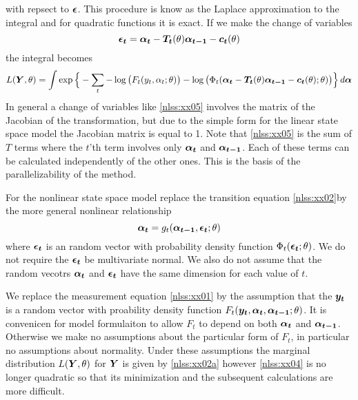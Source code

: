 with repsect to $\boldsymbol{\epsilon}$.
This procedure is know as the Laplace approximation to the integral
and for quadratic functions it is exact.
If we make the change of variables
\begin{equation}
 \boldsymbol{\epsilon_t}=\boldsymbol{\alpha_t} -\boldsymbol{T_t}(\theta)\boldsymbol{\alpha_{t-1}}-\boldsymbol{c_t}(\theta)\label{nlss:xx05}
\end{equation}
the integral becomes
\begin{equation}
L(\boldsymbol{Y},\theta)=
  \int \exp\Big\{-\sum_t -\log\big(F_t(y_t,\alpha_t;\theta)\big)
 -\log\big(\Phi_t(
   \boldsymbol{\alpha_t} -\boldsymbol{T_t}(\theta)\boldsymbol{\alpha_{t-1}}-\boldsymbol{c_t}(\theta);
     \theta)\big)\Big\}\,d\boldsymbol{\alpha} \label{nlss:xx06}
\end{equation}
In general a change of variables like \ref{nlss:xx05}
involves the matrix of the Jacobian of the transformation,
but due to the simple form for the linear state space model the
Jacobian matrix is equal to 1.
Note that \ref{nlss:xx05}
is the sum of $T$ terms where the $t$'th term involves only
$\boldsymbol{\alpha_t}$ and $\boldsymbol{\alpha_{t-1}}$. Each of these terms can be calculated
independently of the other ones. This is the basis of the
parallelizability of the method.


For the nonlinear state space model replace the transition equation
\ref{nlss:xx02}by the more general nonlinear relationship
\begin{equation}
 {\boldsymbol{\alpha_t}=g_t(\boldsymbol{\alpha_{t-1}},\boldsymbol{\epsilon_t};\theta)}\label{nlss:xx1}
\end{equation}
where $\boldsymbol{\epsilon_t}$
is an  random vector with probability density function
$\Phi_t(\boldsymbol{\epsilon_t};\theta)$. 
We do not require the $\boldsymbol{\epsilon_t}$ be multivariate normal.
We also do not assume that the random vecotrs $\boldsymbol{\alpha_t}$
and $\boldsymbol{\epsilon_t}$ have the same dimension for each value of $t$.

We replace the measurement equation \ref{nlss:xx01}
by the assumption that the 
$\boldsymbol{y_t}$ is a random vector with
proability density function $F_t(\boldsymbol{y_t},\boldsymbol{\alpha_t},\boldsymbol{\alpha_{t-1}};\theta)$.
It is convenicen for model formulaiton to allow $F_t$ to depend on
both $\boldsymbol{\alpha_t}$ and $\boldsymbol{\alpha_{t-1}}$.
Otherwise we make no assumptions
about the particular form of $F_t$,
in particular no assumptions about normality.
Under these assumptions 
the marginal distribution $L(\boldsymbol{Y},\theta)$ for $\boldsymbol{Y}$ is given by 
\ref{nlss:xx02a} however 
\ref{nlss:xx04} is no longer quadratic  so that its minimization and the subsequent calculations are more difficult.


